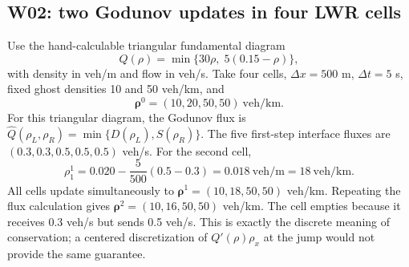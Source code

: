 \documentclass[11pt,a4paper,openany]{book}
\numberwithin{equation}{chapter}
\numberwithin{figure}{chapter}
\numberwithin{table}{chapter}
\begin{document}
\subsection{W02: two Godunov updates in four LWR cells}
Use the hand-calculable triangular fundamental diagram
\begin{equation}
Q(\rho)=\min\{30\rho,\;5(0.15-\rho)\},
\end{equation}
with density in veh/m and flow in veh/s. Take four cells, $\Delta x=500$ m, $\Delta t=5$ s, fixed ghost densities 10 and 50 veh/km, and
\[
\bm\rho^0=(10,20,50,50)\ \mathrm{veh/km}.
\]
For this triangular diagram, the Godunov flux is $\widehat Q(\rho_L,\rho_R)=\min\{D(\rho_L),S(\rho_R)\}$. The five first-step interface fluxes are $(0.3,0.3,0.5,0.5,0.5)$ veh/s. For the second cell,
\begin{equation}
\rho_1^1=0.020-\frac{5}{500}(0.5-0.3)=0.018\ \mathrm{veh/m}=18\ \mathrm{veh/km}.
\end{equation}
All cells update simultaneously to $\bm\rho^1=(10,18,50,50)$ veh/km. Repeating the flux calculation gives $\bm\rho^2=(10,16,50,50)$ veh/km. The cell empties because it receives 0.3 veh/s but sends 0.5 veh/s. This is exactly the discrete meaning of conservation; a centered discretization of $Q'(\rho)\rho_x$ at the jump would not provide the same guarantee.
\end{document}
